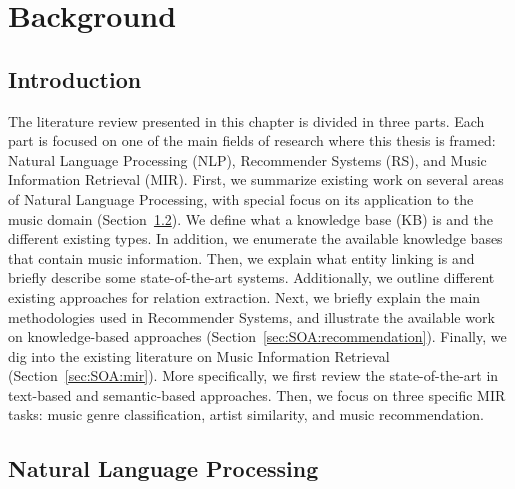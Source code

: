 
\chapter{Background}
\label{sec:SOA}

\section{Introduction}
\label{sec:SOA:Introduction}

The literature review presented in this chapter is divided in three parts. Each part is focused on one of the main fields of research where this thesis is framed: Natural Language Processing (NLP), Recommender Systems (RS), and Music Information Retrieval (MIR).
First, we summarize existing work on several areas of Natural Language Processing, with special focus on its application to the music domain (Section~\ref{sec:SOA:nlu}). 
We define what a knowledge base (KB) is and the different existing types. In addition, we enumerate the available knowledge bases that contain music information.
Then, we explain what entity linking is and briefly describe some state-of-the-art systems. Additionally, we outline different existing approaches for relation extraction. 
Next, we briefly explain the main methodologies used in Recommender Systems, and illustrate the available work on knowledge-based approaches (Section~\ref{sec:SOA:recommendation}).
Finally, we dig into the existing literature on Music Information Retrieval (Section~\ref{sec:SOA:mir}). More specifically, we first review the state-of-the-art in text-based and semantic-based approaches. Then, we focus on three specific MIR tasks: music genre classification, artist similarity, and music recommendation.


\section{Natural Language Processing}
\label{sec:SOA:nlu}

